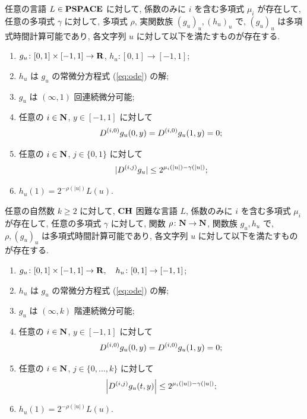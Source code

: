 \begin{lemma}
 \label{DifferentiableFamily}
 任意の言語 $L \in \mathbf{PSPACE}$ に対して, 
 係数のみに $i$ を含む多項式 $\mu_i$ が存在して,
 任意の多項式 $\gamma$ に対して,
 多項式 $\rho$, 実関数族 $(g_u)_u, (h_u)_u$ で, 
 $(g_u)_u$ は多項式時間計算可能であり,
 各文字列 $u$ に対して以下を満たすものが存在する.
 \begin{enumerate}
  \item $g_u\colon [0,1] \times [-1,1]\to \mathbf R$, $h_u\colon [0,1] \to [-1,1]$;
  \item $h_u$ は $g_u$ の常微分方程式 (\ref{eq:ode}) の解; 
  \item $g_u$ は $(\infty, 1)$ 回連続微分可能;
  \item 任意の $i \in \mathbf N$, $y \in [-1,1]$ に対して
	\begin{equation*}
	 D ^{(i, 0)} g_u(0,y) = D ^{(i, 0)} g_u(1,y) = 0;
	\end{equation*}
  \item \label{enum:infty1}
	任意の $i \in \mathbf N$, $j \in \{0,1\}$ に対して
	\begin{equation*}
	 |D ^{(i,j)} g_u| \leq 2^{\mu_i (|u|) - \gamma(|u|)};
	\end{equation*}
  \item $h_u(1) = 2^{-\rho(|u|)}L(u)$.
 \end{enumerate}
\end{lemma}


 \begin{lemma}
  \label{KTimesFamily}
  任意の自然数 $k \ge 2$ に対して,
  $\mathbf{CH}$ 困難な言語 $L$,
  係数のみに $i$ を含む多項式 $\mu_i$ が存在して,
  任意の多項式 $\gamma$ に対して,
  関数 $\rho \colon \mathbf N \to \mathbf N$, 関数族 $g_u, h_u$ で,
  $\rho, (g_u)_u$ は多項式時間計算可能であり,
  各文字列 $u$ に対して以下を満たすものが存在する.
  \begin{enumerate}
   \item $g_u\colon [0,1] \times [-1,1]\to \mathbf R, \quad h_u\colon [0,1] \to [-1,1]$;
   \item $h_u$ は $g_u$ の常微分方程式 (\ref{eq:ode}) の解;
   \item $g_u$ は $(\infty, k)$ 階連続微分可能;
   \item \label{enum:boundary}
	 任意の $i \in \mathbf N$, $y \in [-1,1]$ に対して
	 \begin{equation*}
	  D^{(i, 0)} g_u(0,y) = D^{(i, 0)} g_u(1,y) = 0 ;
	 \end{equation*}
   \item \label{enum:inftyk}
	 任意の $i \in \mathbf N$, $j \in \{0, \dots, k\}$ に対して
	 \begin{equation*}
	  \left|D^{(i,j)} g_u(t,y)\right| \le 2^{\mu_i(|u|) - \gamma(|u|)};
	 \end{equation*}
   \item $h_u(1) = 2^{-\rho(|u|)}L(u)$.
  \end{enumerate}
 \end{lemma}


